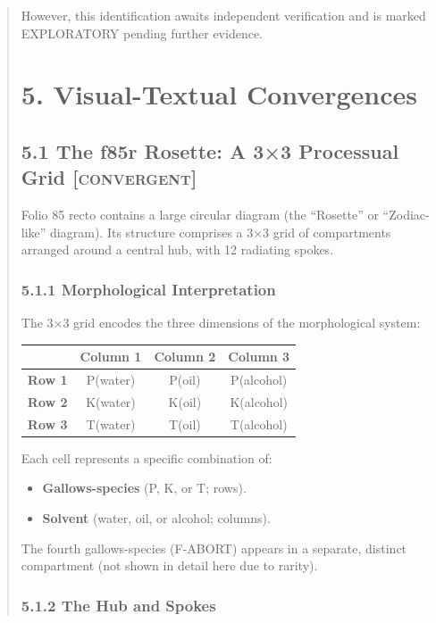 \documentclass[11pt,a4paper]{article}
\begin{document}
\begin{abstract}
However, this identification awaits independent verification and is marked EXPLORATORY pending further evidence.

\section*{5. Visual-Textual Convergences}

\subsection*{5.1 The f85r Rosette: A 3×3 Processual Grid \textsc{[convergent]}}

Folio 85 recto contains a large circular diagram (the ``Rosette'' or ``Zodiac-like'' diagram). Its structure comprises a 3×3 grid of compartments arranged around a central hub, with 12 radiating spokes.

\subsubsection*{5.1.1 Morphological Interpretation}

The 3×3 grid encodes the three dimensions of the morphological system:

\begin{center}
\begin{tabular}{lccc}
\hline
& \textbf{Column 1} & \textbf{Column 2} & \textbf{Column 3} \\
\hline
\textbf{Row 1} & P(water) & P(oil) & P(alcohol) \\
\textbf{Row 2} & K(water) & K(oil) & K(alcohol) \\
\textbf{Row 3} & T(water) & T(oil) & T(alcohol) \\
\hline
\end{tabular}
\end{center}

Each cell represents a specific combination of:
\begin{itemize}
\item \textbf{Gallows-species} (P, K, or T; rows).
\item \textbf{Solvent} (water, oil, or alcohol; columns).
\end{itemize}

The fourth gallows-species (F-ABORT) appears in a separate, distinct compartment (not shown in detail here due to rarity).

\subsubsection*{5.1.2 The Hub and Spokes}


\end{abstract}
\end{document}

